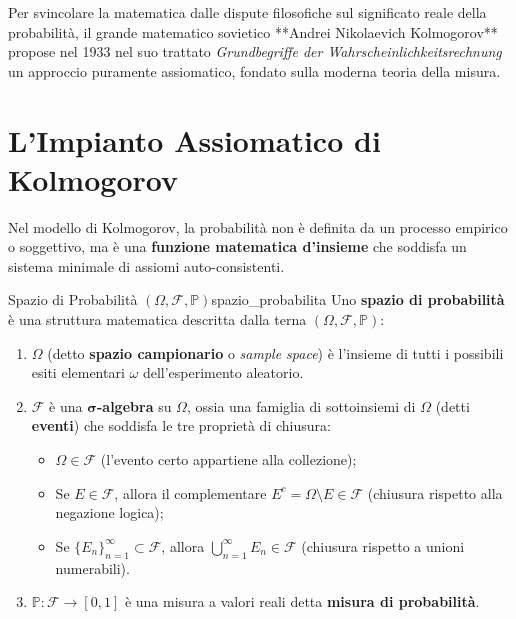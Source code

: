 Per svincolare la matematica dalle dispute filosofiche sul significato reale della probabilità, il grande matematico sovietico **Andrei Nikolaevich Kolmogorov** propose nel 1933 nel suo trattato \emph{Grundbegriffe der Wahrscheinlichkeitsrechnung} un approccio puramente assiomatico, fondato sulla moderna teoria della misura.

\section{L'Impianto Assiomatico di Kolmogorov}
\label{sec:assiomi_kolmogorov_dettaglio}

Nel modello di Kolmogorov, la probabilità non è definita da un processo empirico o soggettivo, ma è una \textbf{funzione matematica d'insieme} che soddisfa un sistema minimale di assiomi auto-consistenti.

\begin{definizione}{Spazio di Probabilità $(\Omega, \mathcal{F}, \mathbb{P})$}{spazio_probabilita}
Uno \textbf{spazio di probabilità} è una struttura matematica descritta dalla terna $(\Omega, \mathcal{F}, \mathbb{P})$:
\begin{enumerate}
    \item $\Omega$ (detto \textbf{spazio campionario} o \emph{sample space}) è l'insieme di tutti i possibili esiti elementari $\omega$ dell'esperimento aleatorio.
    \item $\mathcal{F}$ è una \textbf{$\bm{\sigma}$-algebra} su $\Omega$, ossia una famiglia di sottoinsiemi di $\Omega$ (detti \textbf{eventi}) che soddisfa le tre proprietà di chiusura:
    \begin{itemize}
        \item $\Omega \in \mathcal{F}$ (l'evento certo appartiene alla collezione);
        \item Se $E \in \mathcal{F}$, allora il complementare $E^c = \Omega \setminus E \in \mathcal{F}$ (chiusura rispetto alla negazione logica);
        \item Se $\{E_n\}_{n=1}^\infty \subset \mathcal{F}$, allora $\bigcup_{n=1}^\infty E_n \in \mathcal{F}$ (chiusura rispetto a unioni numerabili).
    \end{itemize}
    \item $\mathbb{P}: \mathcal{F} \to [0, 1]$ è una misura a valori reali detta \textbf{misura di probabilità}.
\end{enumerate}
\end{definizione}

